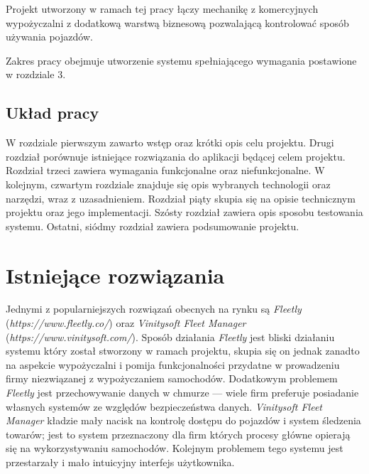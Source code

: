 \documentclass[eng,printmode,openany]{mgr}
\begin{document}
	Projekt utworzony w ramach tej pracy łączy mechanikę z komercyjnych wypożyczalni z dodatkową warstwą biznesową pozwalającą kontrolować sposób używania pojazdów.
	
	Zakres pracy obejmuje utworzenie systemu spełniającego wymagania postawione w rozdziale 3.
	
	\section{Układ pracy}
	W rozdziale pierwszym zawarto wstęp oraz krótki opis celu projektu. Drugi rozdział porównuje istniejące rozwiązania do aplikacji będącej celem projektu. Rozdział trzeci zawiera wymagania funkcjonalne oraz niefunkcjonalne. W kolejnym, czwartym rozdziale znajduje się opis wybranych technologii oraz narzędzi, wraz z uzasadnieniem. Rozdział piąty skupia się na opisie technicznym projektu oraz jego implementacji. Szósty rozdział zawiera opis sposobu testowania systemu. Ostatni, siódmy rozdział zawiera podsumowanie projektu.
	
	\newpage
	\chapter{Istniejące rozwiązania}
	Jednymi z popularniejszych rozwiązań obecnych na rynku są \textit{Fleetly} (\textit{https://www.fleetly.co/}) oraz \textit{Vinitysoft Fleet Manager} (\textit{https://www.vinitysoft.com/}). Sposób działania \textit{Fleetly} jest bliski działaniu systemu który został stworzony w ramach projektu, skupia się on jednak zanadto na aspekcie wypożyczalni i pomija funkcjonalności przydatne w prowadzeniu firmy niezwiązanej z wypożyczaniem samochodów. Dodatkowym problemem \textit{Fleetly} jest przechowywanie danych w chmurze — wiele firm preferuje posiadanie własnych systemów ze względów bezpieczeństwa danych.  \textit{Vinitysoft Fleet Manager} kładzie mały nacisk na kontrolę dostępu do pojazdów i system śledzenia towarów; jest to system przeznaczony dla firm których procesy główne opierają się na wykorzystywaniu samochodów. Kolejnym problemem tego systemu jest przestarzały i mało intuicyjny interfejs użytkownika.
	
\end{document}

